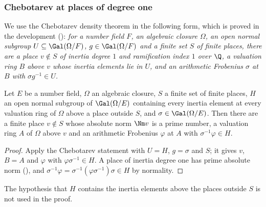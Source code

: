 \subsubsection{Chebotarev at places of degree one}
We use the Chebotarev density theorem \cite{Chebotarev1926} in the following form, which is proved in the
development (): \emph{for a number field $F$, an algebraic closure
$\Omega$, an open normal subgroup $U\subseteq\Gal(\Omega/F)$, $g\in\Gal(\Omega/F)$ and a finite set $S$ of finite
places, there are a place $v\notin S$ of inertia degree $1$ and ramification index $1$ over $\Q$, a valuation ring
$B$ above $v$ whose inertia elements lie in $U$, and an arithmetic Frobenius $\sigma$ at $B$ with $\sigma
g^{-1}\in U$.}

\begin{lemma}\label{pf:reckernel:cheb}
Let $E$ be a number field, $\Omega$ an algebraic closure, $S$ a finite set of finite places, $H$ an open normal
subgroup of $\Gal(\Omega/E)$ containing every inertia element at every valuation ring of $\Omega$ above a place outside
$S$, and $\sigma\in\Gal(\Omega/E)$. Then there are a finite place $v\notin S$ whose
absolute norm $\Nm v$ is a prime number, a valuation ring $A$ of $\Omega$ above $v$ and an arithmetic Frobenius
$\varphi$ at $A$ with $\sigma^{-1}\varphi\in H$.
\end{lemma}

\begin{proof}
Apply the Chebotarev statement with $U=H$, $g=\sigma$ and $S$; it gives $v$, $B=A$ and $\varphi$ with
$\varphi\sigma^{-1}\in H$. A place of inertia degree one has prime absolute norm
(), and
$\sigma^{-1}\varphi=\sigma^{-1}(\varphi\sigma^{-1})\sigma\in H$ by normality.
\end{proof}

\begin{remark}
The hypothesis that $H$ contains the inertia elements above the places outside $S$ is not used in the proof.
\end{remark}

